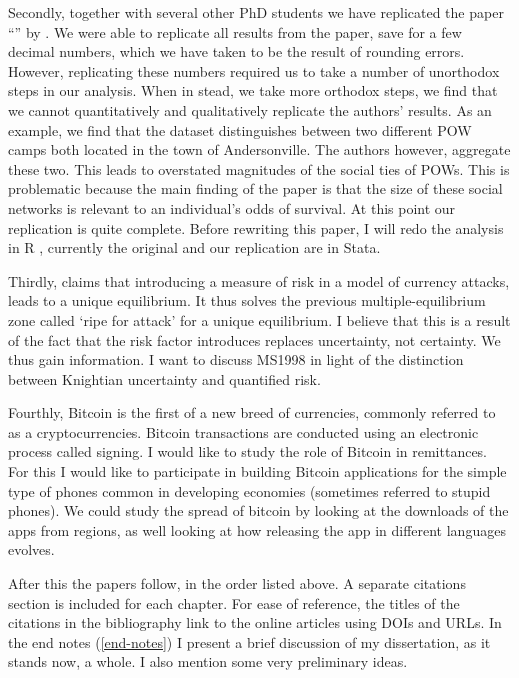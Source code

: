 \documentclass[a4paper]{report}\usepackage{graphicx, color}
\begin{document}
\begin{refsection}
Secondly, together with several other PhD students we have replicated the paper ``'' by \textcite{costa2007surviving}. We were able to replicate all results from the paper, save for a few decimal numbers, which we have taken to be the result of rounding errors. However, replicating these numbers required us to take a number of unorthodox steps in our analysis. When in stead, we take more orthodox steps, we find that we cannot quantitatively and qualitatively replicate the authors' results. As an example, we find that the dataset distinguishes between two different POW camps both located in the town of Andersonville. The authors however, aggregate these two. This leads to overstated magnitudes of the social ties of POWs. This is problematic because the main finding of the paper is that the size of these social networks is relevant to an individual's odds of survival. At this point our replication is quite complete. Before rewriting this paper, I will redo the analysis in R \parencite{R}, currently the original and our replication are in Stata.

Thirdly, \textcite{morris1998unique} claims that introducing a measure of risk in a model of currency attacks, leads to a unique equilibrium. It thus solves the previous multiple-equilibrium zone called `ripe for attack' for a unique equilibrium. I believe that this is a result of the fact that the risk factor introduces replaces uncertainty, not certainty. We thus gain information. I want to discuss MS1998 in light of the distinction between Knightian uncertainty and quantified risk.

Fourthly, Bitcoin is the first of a new breed of currencies, commonly referred to as a cryptocurrencies. Bitcoin transactions are conducted using an electronic process called signing. I would like to study the role of Bitcoin in remittances. For this I would like to participate in building Bitcoin applications for the simple type of phones common in developing economies (sometimes referred to stupid phones). We could study the spread of bitcoin by looking at the downloads of the apps from regions, as well looking at how releasing the app in different languages evolves.

After this the papers follow, in the order listed above. A separate citations section is included for each chapter. For ease of reference, the titles of the citations in the bibliography link to the online articles using DOIs and URLs. In the end notes (\ref{end-notes}) I present a brief discussion of my dissertation, as it stands now, a whole. I also mention some very preliminary ideas.

\printbibliography
\end{refsection}
\end{document}
